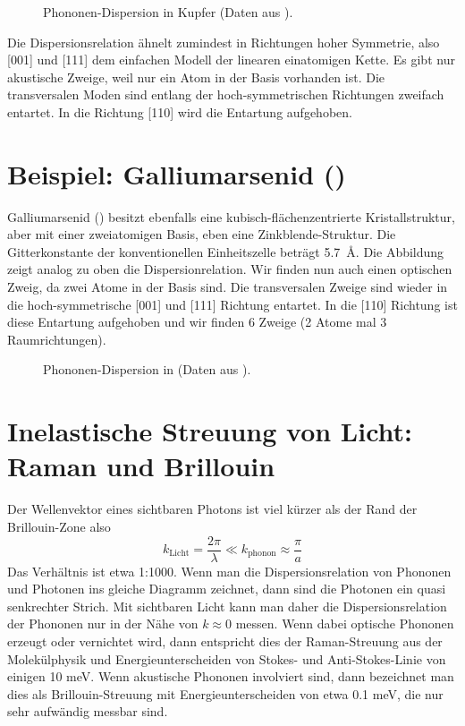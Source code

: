 	\begin{figure}
\caption{Phononen-Dispersion in Kupfer (Daten aus \cite{Svensson_cu}). \label{fig:phonon_kupfer}}
\end{figure}

Die Dispersionsrelation ähnelt zumindest in Richtungen hoher Symmetrie, also [001] und [111]	dem einfachen Modell der linearen einatomigen Kette. Es gibt nur akustische Zweige, weil nur ein Atom in der Basis vorhanden ist. Die transversalen Moden sind entlang der hoch-symmetrischen Richtungen zweifach entartet. In die Richtung [110] wird die Entartung aufgehoben.


\section{Beispiel: Galliumarsenid ()}


Galliumarsenid () besitzt ebenfalls eine kubisch-flächenzentrierte Kristallstruktur, aber mit einer zweiatomigen Basis, eben eine Zinkblende-Struktur. Die Gitterkonstante der konventionellen Einheitszelle beträgt 5.7~\AA. Die Abbildung zeigt analog zu oben die Dispersionrelation. Wir finden nun auch einen optischen Zweig, da zwei Atome in der Basis sind. Die transversalen Zweige sind wieder in die hoch-symmetrische [001] und [111] Richtung entartet. In die [110] Richtung ist diese Entartung aufgehoben und wir finden 6 Zweige (2 Atome mal 3 Raumrichtungen).


\begin{figure}
\caption{Phononen-Dispersion in  (Daten aus \cite{Strauch_gaas} ).}
\end{figure}



\section{Inelastische Streuung von Licht: Raman und Brillouin}

Der Wellenvektor eines sichtbaren Photons ist viel kürzer als der Rand der Brillouin-Zone also
\begin{equation}
 k_\text{Licht} = \frac{2 \pi}{\lambda} \ll k_\text{phonon} \approx \frac{\pi}{a}
\end{equation}
Das Verhältnis ist etwa 1:1000. Wenn man die Dispersionsrelation von Phononen und Photonen ins gleiche Diagramm zeichnet, dann sind die Photonen ein quasi senkrechter Strich. Mit sichtbaren Licht kann man daher die Dispersionsrelation der Phononen nur in der Nähe von $k \approx 0$ messen. Wenn dabei optische Phononen erzeugt oder vernichtet wird, dann entspricht dies der Raman-Streuung aus der Molekülphysik und Energieunterscheiden von Stokes- und Anti-Stokes-Linie von einigen 10 meV. Wenn akustische Phononen involviert sind, dann bezeichnet man dies als Brillouin-Streuung mit Energieunterscheiden von etwa 0.1 meV, die nur sehr aufwändig messbar sind.


